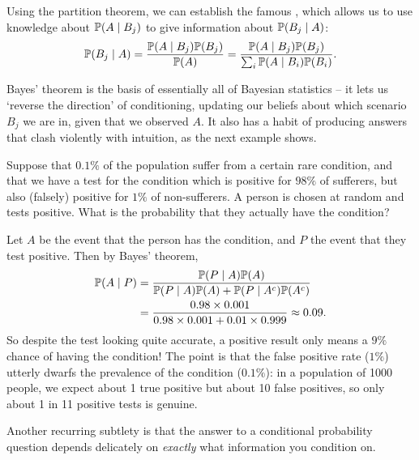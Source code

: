 \documentclass[a4paper]{scrartcl}
\begin{document}
Using the partition theorem, we can establish the famous , which allows us to use knowledge about $\mathbb{P}(A \mid B_j)$ to give information about $\mathbb{P}(B_j \mid A)$:
$$
\mathbb{P}(B_j \mid A) = \frac{\mathbb{P}(A \mid B_j) \mathbb{P}(B_j)}{\mathbb{P}(A)} = \frac{\mathbb{P}(A \mid B_j) \mathbb{P}(B_j)}{\sum_i \mathbb{P}(A \mid B_i) \mathbb{P}(B_i)}.
$$

Bayes' theorem is the basis of essentially all of Bayesian statistics -- it lets us `reverse the direction' of conditioning, updating our beliefs about which scenario $B_j$ we are in, given that we observed $A$. It also has a habit of producing answers that clash violently with intuition, as the next example shows.

\begin{example}
	Suppose that $0.1\%$ of the population suffer from a certain rare condition, and that we have a test for the condition which is positive for $98\%$ of sufferers, but also (falsely) positive for $1\%$ of non-sufferers. A person is chosen at random and tests positive. What is the probability that they actually have the condition?

	Let $A$ be the event that the person has the condition, and $P$ the event that they test positive. Then by Bayes' theorem,
	\begin{align*}
		\mathbb{P}(A \mid P) &= \frac{\mathbb{P}(P \mid A) \mathbb{P}(A)}{\mathbb{P}(P \mid A)\mathbb{P}(A) + \mathbb{P}(P \mid A^c) \mathbb{P}(A^c)} \\
		&= \frac{0.98 \times 0.001}{0.98 \times 0.001 + 0.01 \times 0.999} \approx 0.09.
	\end{align*}
	So despite the test looking quite accurate, a positive result only means a $9\%$ chance of having the condition! The point is that the false positive rate ($1\%$) utterly dwarfs the prevalence of the condition ($0.1\%$): in a population of 1000 people, we expect about 1 true positive but about 10 false positives, so only about 1 in 11 positive tests is genuine.
\end{example}

Another recurring subtlety is that the answer to a conditional probability question depends delicately on \emph{exactly} what information you condition on.
\end{document}

